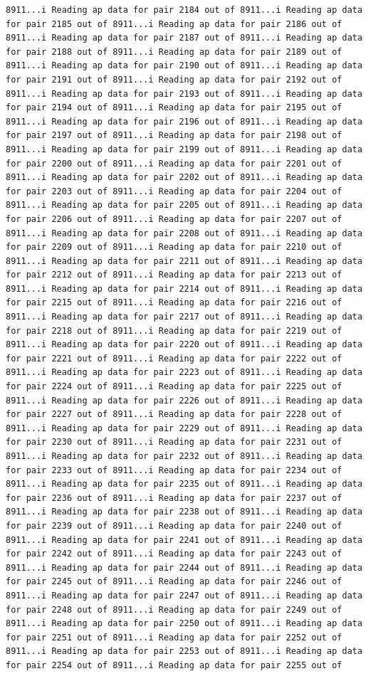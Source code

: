 \documentclass[
]{article}
\begin{document}
\begin{verbatim}
8911...i Reading ap data for pair 2184 out of 8911...i Reading ap data for pair 2185 out of 8911...i Reading ap data for pair 2186 out of 8911...i Reading ap data for pair 2187 out of 8911...i Reading ap data for pair 2188 out of 8911...i Reading ap data for pair 2189 out of 8911...i Reading ap data for pair 2190 out of 8911...i Reading ap data for pair 2191 out of 8911...i Reading ap data for pair 2192 out of 8911...i Reading ap data for pair 2193 out of 8911...i Reading ap data for pair 2194 out of 8911...i Reading ap data for pair 2195 out of 8911...i Reading ap data for pair 2196 out of 8911...i Reading ap data for pair 2197 out of 8911...i Reading ap data for pair 2198 out of 8911...i Reading ap data for pair 2199 out of 8911...i Reading ap data for pair 2200 out of 8911...i Reading ap data for pair 2201 out of 8911...i Reading ap data for pair 2202 out of 8911...i Reading ap data for pair 2203 out of 8911...i Reading ap data for pair 2204 out of 8911...i Reading ap data for pair 2205 out of 8911...i Reading ap data for pair 2206 out of 8911...i Reading ap data for pair 2207 out of 8911...i Reading ap data for pair 2208 out of 8911...i Reading ap data for pair 2209 out of 8911...i Reading ap data for pair 2210 out of 8911...i Reading ap data for pair 2211 out of 8911...i Reading ap data for pair 2212 out of 8911...i Reading ap data for pair 2213 out of 8911...i Reading ap data for pair 2214 out of 8911...i Reading ap data for pair 2215 out of 8911...i Reading ap data for pair 2216 out of 8911...i Reading ap data for pair 2217 out of 8911...i Reading ap data for pair 2218 out of 8911...i Reading ap data for pair 2219 out of 8911...i Reading ap data for pair 2220 out of 8911...i Reading ap data for pair 2221 out of 8911...i Reading ap data for pair 2222 out of 8911...i Reading ap data for pair 2223 out of 8911...i Reading ap data for pair 2224 out of 8911...i Reading ap data for pair 2225 out of 8911...i Reading ap data for pair 2226 out of 8911...i Reading ap data for pair 2227 out of 8911...i Reading ap data for pair 2228 out of 8911...i Reading ap data for pair 2229 out of 8911...i Reading ap data for pair 2230 out of 8911...i Reading ap data for pair 2231 out of 8911...i Reading ap data for pair 2232 out of 8911...i Reading ap data for pair 2233 out of 8911...i Reading ap data for pair 2234 out of 8911...i Reading ap data for pair 2235 out of 8911...i Reading ap data for pair 2236 out of 8911...i Reading ap data for pair 2237 out of 8911...i Reading ap data for pair 2238 out of 8911...i Reading ap data for pair 2239 out of 8911...i Reading ap data for pair 2240 out of 8911...i Reading ap data for pair 2241 out of 8911...i Reading ap data for pair 2242 out of 8911...i Reading ap data for pair 2243 out of 8911...i Reading ap data for pair 2244 out of 8911...i Reading ap data for pair 2245 out of 8911...i Reading ap data for pair 2246 out of 8911...i Reading ap data for pair 2247 out of 8911...i Reading ap data for pair 2248 out of 8911...i Reading ap data for pair 2249 out of 8911...i Reading ap data for pair 2250 out of 8911...i Reading ap data for pair 2251 out of 8911...i Reading ap data for pair 2252 out of 8911...i Reading ap data for pair 2253 out of 8911...i Reading ap data for pair 2254 out of 8911...i Reading ap data for pair 2255 out of 
\end{verbatim}
\end{document}
